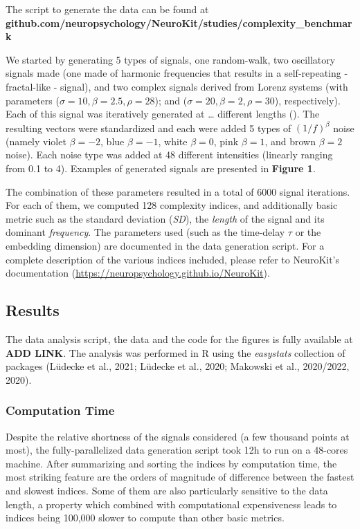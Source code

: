 \documentclass[
  man]{apa6}
\begin{document}
The script to generate the data can be found at \textbf{github.com/neuropsychology/NeuroKit/studies/complexity\_benchmark}

We started by generating 5 types of signals, one random-walk, two oscillatory signals made (one made of harmonic frequencies that results in a self-repeating - fractal-like - signal), and two complex signals derived from Lorenz systems (with parameters (\(\sigma = 10, \beta = 2.5, \rho = 28\)); and (\(\sigma = 20, \beta = 2, \rho = 30\)), respectively). Each of this signal was iteratively generated at \ldots{} different lengths (). The resulting vectors were standardized and each were added 5 types of \((1/f)^\beta\) noise (namely violet \(\beta=-2\), blue \(\beta=-1\), white \(\beta=0\), pink \(\beta=1\), and brown \(\beta=2\) noise). Each noise type was added at 48 different intensities (linearly ranging from 0.1 to 4). Examples of generated signals are presented in \textbf{Figure 1}.

The combination of these parameters resulted in a total of 6000 signal iterations. For each of them, we computed 128 complexity indices, and additionally basic metric such as the standard deviation (\emph{SD}), the \emph{length} of the signal and its dominant \emph{frequency}. The parameters used (such as the time-delay \(\tau\) or the embedding dimension) are documented in the data generation script. For a complete description of the various indices included, please refer to NeuroKit's documentation (\url{https://neuropsychology.github.io/NeuroKit}).

\hypertarget{results}{%
\subsection{Results}\label{results}}

The data analysis script, the data and the code for the figures is fully available at \textbf{ADD LINK}. The analysis was performed in R using the \emph{easystats} collection of packages (Lüdecke et al., 2021; Lüdecke et al., 2020; Makowski et al., 2020/2022, 2020).

\hypertarget{computation-time}{%
\subsubsection{Computation Time}\label{computation-time}}

Despite the relative shortness of the signals considered (a few thousand points at most), the fully-parallelized data generation script took 12h to run on a 48-cores machine. After summarizing and sorting the indices by computation time, the most striking feature are the orders of magnitude of difference between the fastest and slowest indices. Some of them are also particularly sensitive to the data length, a property which combined with computational expensiveness leads to indices being 100,000 slower to compute than other basic metrics.
\end{document}
